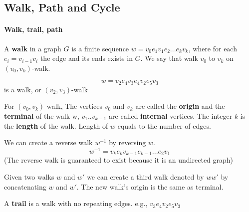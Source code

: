         \subsection{Walk, Path and Cycle}
            \paragraph{Walk, trail, path}
                \begin{definition}[walk]
                    A \textbf{walk} in a graph $G$ is a finite sequence $w=v_0e_1v_1e_2...e_kv_k$, where for each $e_i=v_{i-1}v_i$ the edge and its ends exists in $G$. We say that walk $v_0$ to $v_k$ on $(v_0, v_k)$-walk.
                \end{definition}

                \begin{example}
                    \begin{equation*}
                        w = v_2e_4v_3e_4v_2e_5v_3
                    \end{equation*}
                    is a walk, or $(v_2, v_3)$-walk
                \end{example}

                \begin{definition}
                    For $(v_0, v_k)$-walk, The vertices $v_0$ and $v_k$ are called the \textbf{origin} and the \textbf{terminal} of the walk w, $v_1..v_{k-1}$ are called \textbf{internal} vertices. The integer $k$ is the \textbf{length} of the walk. Length of $w$ equals to the number of edges.
                \end{definition}

                We can create a reverse walk $w^{-1}$ by reversing $w$.
                \begin{equation*}
                    w^{-1} = v_ke_kv_{k-1}e_{k-1}...e_2v_1
                \end{equation*}
                (The reverse walk is guaranteed to exist because it is an undirected graph)

                Given two walks $w$ and $w'$ we can create a third walk denoted by $ww'$ by concatenating $w$ and $w'$. The new walk's origin is the same as terminal.

                \begin{definition}[trail]
                    A \textbf{trail} is a walk with no repeating edges. e.g., $v_3e_4v_2e_5v_3$
                \end{definition}

